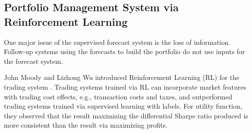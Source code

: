\subsection{Portfolio Management System via Reinforcement Learning}
One major issue of the supervised forecast system is the loss of information. Follow-up systems using the forecasts to build the portfolio do not use inputs for the forecast system.
\par
John Moody and Lizhong Wu introduced Reinforcement Learning (RL) for the trading system \cite{618952}. Trading systems trained via RL can incorporate market features with trading cost effects, e.g., transaction costs and taxes, and outperformed trading systems trained via supervised learning with labels. For utility function, they observed that the result maximizing the differential Sharpe ratio produced is more consistent than the result via maximizing profits\cite{618952}.